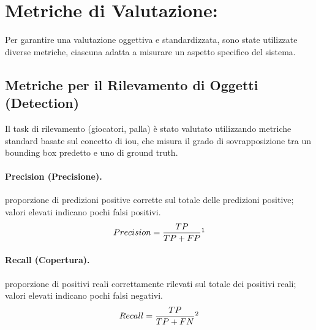 \documentclass[12pt,a4paper,openright,twoside]{book}
\begin{document}
\section{Metriche di Valutazione:}
\label{sec:metriche-valutazione}
Per garantire una valutazione oggettiva e standardizzata, sono state utilizzate diverse metriche, ciascuna adatta 
a misurare un aspetto specifico del sistema.

\subsection{Metriche per il Rilevamento di Oggetti (Detection)}
\label{sec:metriche-detection}
Il task di rilevamento (giocatori, palla) è stato valutato utilizzando metriche standard basate sul concetto di 
\ac{iou}, che misura il grado di sovrapposizione tra un bounding box predetto e uno di ground truth.

\paragraph{Precision (Precisione).} proporzione di predizioni positive corrette sul totale delle predizioni positive; 
valori elevati indicano pochi falsi positivi.
\begin{equation}
  \label{eq:precision}
  {Precision} = \frac{TP}{TP + FP}\footnotemark
\end{equation}

\paragraph{Recall (Copertura).} proporzione di positivi reali correttamente rilevati sul totale dei positivi reali; 
valori elevati indicano pochi falsi negativi.
\begin{equation}
  \label{eq:recall}
  {Recall} = \frac{TP}{TP + FN}\footnotemark
\end{equation}
\end{document}

